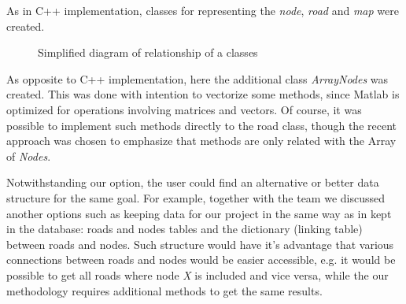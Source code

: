 \documentclass{article}
\begin{document}
As in C++ implementation, classes for representing the \textit{node}, \textit{road} and \textit{map} were created.

\begin{figure}[!h]
\centering
{}
\caption{Simplified diagram of relationship of a classes}
\end{figure}

As opposite to C++ implementation, here the additional class \textit{ArrayNodes} was created. This was done with intention to vectorize some methods, since Matlab is optimized for operations involving matrices and vectors. Of course, it was possible to implement such methods directly to the road class, though the recent approach was chosen to emphasize that methods are only related with the Array of \textit{Nodes}.

Notwithstanding our option, the user could find an alternative or better data structure for the same goal.
For example, together with the team we discussed another options such as keeping data for our project in the same way as in kept in the database: roads and nodes tables and the dictionary (linking table) between roads and nodes. Such structure would have it's advantage that various connections between roads and nodes would be easier accessible, e.g. it would be possible to get all roads where node \textit{X} is included and vice versa, while the our methodology requires additional methods to get the same results. 

\end{document}
